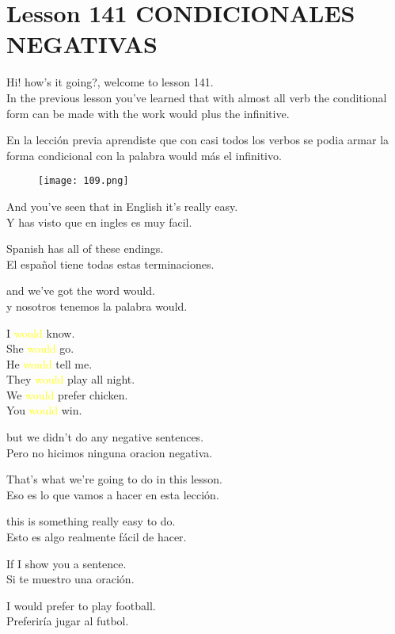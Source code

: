 \section{Lesson 141 CONDICIONALES NEGATIVAS}

Hi! how's it going?, welcome to lesson 141.\\
In the previous lesson you've learned that with
almost all verb the conditional form can be made
with the work would plus the infinitive.

En la lección previa aprendiste que con casi
todos los verbos se podia armar la forma condicional con
la palabra would más el infinitivo.

\begin{figure}[H]
\centering
\texttt{[image: 109.png]}
\end{figure}

And you've seen that in English it's really easy.\\
Y has visto que en ingles es muy facil.

Spanish has all of these endings.\\
El español tiene todas estas terminaciones.

and we've got the word would.\\
y nosotros tenemos la palabra would.

I \textcolor{yellow}{would} know.\\
She \textcolor{yellow}{would} go.\\
He \textcolor{yellow}{would} tell me.\\
They \textcolor{yellow}{would} play all night.\\
We \textcolor{yellow}{would} prefer chicken.\\
You \textcolor{yellow}{would} win.

but we didn't do any negative sentences.\\
Pero no hicimos ninguna oracion negativa.

That's what we're going to do in this lesson.\\
Eso es lo que vamos a hacer en esta lección.

this is something really easy to do.\\
Esto es algo realmente fácil de hacer.

If I show you a sentence.\\
Si te muestro una oración.

I would prefer to play football.\\
Preferiría jugar al futbol.

